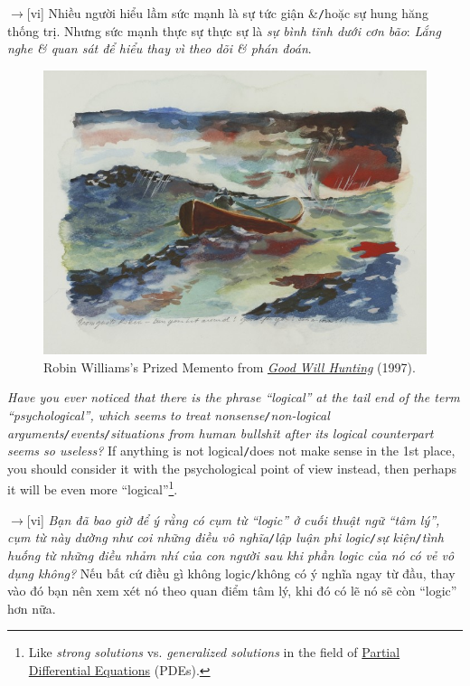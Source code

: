 \documentclass[12pt,twoside]{book}
\begin{document}
{\sf[en]$\to$[vi]} Nhiều người hiểu lầm sức mạnh là sự tức giận \&{\tt/}hoặc sự hung hăng thống trị. Nhưng sức mạnh thực sự thực sự là {\it sự bình tĩnh dưới cơn bão}: {\it Lắng nghe \& quan sát để hiểu thay vì theo dõi \& phán đoán}.

\begin{figure}[H]
	\centering
	\includegraphics[width = 12cm]{boat_under_storm}
	\caption{{\sc Robin Williams}'s Prized Memento from \href{https://www.imdb.com/title/tt0119217}{\it Good Will Hunting} (1997).}
	\label{fig6}
\end{figure}
{\it Have you ever noticed that there is the phrase ``logical'' at the tail end of the term ``psychological'', which seems to treat nonsense{\tt/}non-logical arguments{\tt/}events{\tt/}situations from human bullshit after its logical counterpart seems so useless?} If anything is not logical{\tt/}does not make sense in the 1st place, you should consider it with the psychological point of view instead, then perhaps it will be even more ``logical''\footnote{Like {\it strong solutions} vs. {\it generalized solutions} in the field of \href{https://en.wikipedia.org/wiki/Partial_differential_equation}{Partial Differential Equations} (PDEs).}.

{\sf[en]$\to$[vi]} {\it Bạn đã bao giờ để ý rằng có cụm từ ``logic'' ở cuối thuật ngữ ``tâm lý'', cụm từ này dường như coi những điều vô nghĩa{\tt/}lập luận phi logic{\tt/}sự kiện{\tt/}tình huống từ những điều nhảm nhí của con người sau khi phần logic của nó có vẻ vô dụng không?} Nếu bất cứ điều gì không logic{\tt/}không có ý nghĩa ngay từ đầu, thay vào đó bạn nên xem xét nó theo quan điểm tâm lý, khi đó có lẽ nó sẽ còn ``logic'' hơn nữa.
\end{document}
